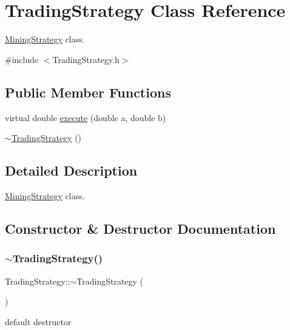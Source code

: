 \hypertarget{classTradingStrategy}{}\section{Trading\+Strategy Class Reference}
\label{classTradingStrategy}


\hyperlink{classMiningStrategy}{Mining\+Strategy} class.  




{\ttfamily \#include $<$Trading\+Strategy.\+h$>$}

\subsection*{Public Member Functions}
\begin{DoxyCompactItemize}
\item 
virtual double \hyperlink{classTradingStrategy_a4029029df708f9f0f013603b19f449ff}{execute} (double a, double b)
\item 
\hyperlink{classTradingStrategy_aab4c9c86553ad820ccc52fda3412d32b}{$\sim$\+Trading\+Strategy} ()
\end{DoxyCompactItemize}


\subsection{Detailed Description}
\hyperlink{classMiningStrategy}{Mining\+Strategy} class. 

\subsection{Constructor \& Destructor Documentation}
\mbox{\label{classTradingStrategy_aab4c9c86553ad820ccc52fda3412d32b}} 
\subsubsection{\texorpdfstring{$\sim$\+Trading\+Strategy()}{~TradingStrategy()}}
{\footnotesize\ttfamily Trading\+Strategy\+::$\sim$\+Trading\+Strategy (\begin{DoxyParamCaption}{ }\end{DoxyParamCaption})}

default destructor 

